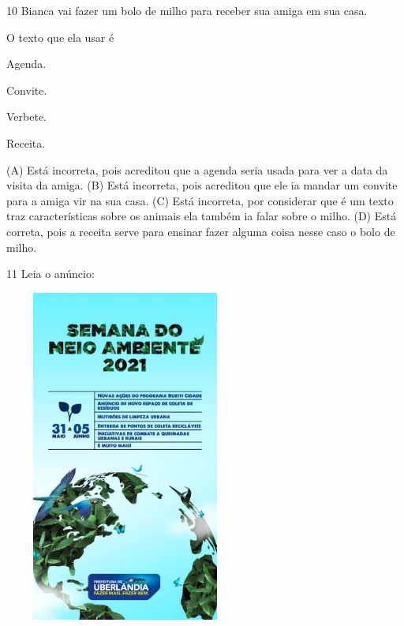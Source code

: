 \num{10} Bianca vai fazer um bolo de milho para receber sua amiga em sua casa.

O texto que ela usar é

\begin{minipage}{.5\textwidth}
\begin{escolha}
\item Agenda.

\item Convite.

\item Verbete.

\item Receita.
\end{escolha}
\end{minipage}

(A) Está incorreta, pois acreditou que a agenda seria usada para ver a
data da visita da amiga.
(B) Está incorreta, pois acreditou que ele ia mandar um convite para a
amiga vir na sua casa.
(C) Está incorreta, por considerar que é um texto traz características
sobre os animais ela também ia falar sobre o milho.
(D) Está correta, pois a receita serve para ensinar fazer alguma coisa
nesse caso o bolo de milho.

\num{11} Leia o anúncio:

\includegraphics[width=3.12674in,height=4.31210in]{media/image145.jpeg}

